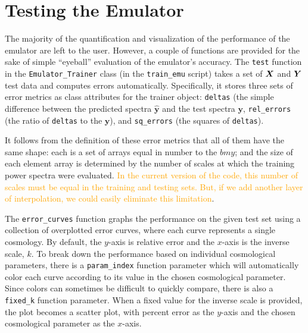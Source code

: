 \section{Testing the Emulator}
\label{test_emu}

The majority of the quantification and visualization of the performance of the
emulator are left to the user. However, a couple of functions are provided for 
the sake of simple ``eyeball'' evaluation of the emulator's accuracy.
The \verb|test| function in the \verb|Emulator_Trainer| class (in the
\verb|train_emu| script) takes a set of $\bm{X}$ and $\bm{Y}$ test data 
and computes errors automatically. Specifically, it stores three sets of error 
metrics as class attributes for the trainer object: \verb|deltas| (the simple 
difference between the predicted spectra $\hat{\bm{y}}$ and the test spectra
$\bm{y}$, \verb|rel_errors| (the ratio of \verb|deltas| to the $\bm{y}$), and
\verb|sq_errors| (the squares of \verb|deltas|).

It follows from the definition of these error metrics that all of them have 
the same shape: each is a set of arrays equal in number to the $bm{y}$; and 
the size of each element array is determined by the number of scales at which 
the training power spectra were evaluated. \textcolor{orange}{In the current
version of the code, this number of scales must be equal in the training and
testing sets. But, if we add another layer of interpolation, we could easily
eliminate this limitation}.

The \verb|error_curves| function graphs the performance on the given test set 
using a collection of overplotted error curves, where each curve represents a 
single cosmology. By default, the $y$-axis is relative error and the
$x$-axis is the inverse scale, $k$. To break down the performance based on 
individual cosmological parameters, there is a \verb|param_index| function
parameter which will automatically color each curve according to its value in 
the chosen cosmological parameter. Since colors can sometimes be difficult to 
quickly compare, there is also a \verb|fixed_k| function parameter. When a 
fixed value for the inverse scale is provided, the plot becomes a scatter 
plot, with percent error as the $y$-axis and the chosen cosmological parameter 
as the $x$-axis.


